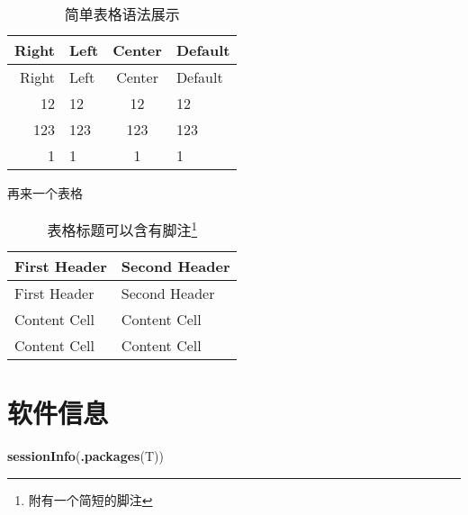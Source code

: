 \documentclass[
]{ctexbook}
\newenvironment{Shaded}{\begin{snugshade}}{\end{snugshade}}
\newcommand{\KeywordTok}[1]{\textcolor[rgb]{0.13,0.29,0.53}{\textbf{#1}}}
\newcommand{\NormalTok}[1]{#1}
\begin{document}
\begin{longtable}[]{@{}rlcl@{}}
\caption{\label{tab:simple-tab} 简单表格语法展示}\tabularnewline
\toprule
Right & Left & Center & Default\tabularnewline
\midrule
\endfirsthead
\toprule
Right & Left & Center & Default\tabularnewline
\midrule
\endhead
12 & 12 & 12 & 12\tabularnewline
123 & 123 & 123 & 123\tabularnewline
1 & 1 & 1 & 1\tabularnewline
\bottomrule
\end{longtable}

再来一个表格

\begin{longtable}[]{@{}ll@{}}
\caption[\label{tab:another-tab} 表格标题可以含有脚注]{\label{tab:another-tab} 表格标题可以含有脚注\footnote{附有一个简短的脚注}}\tabularnewline
\toprule
First Header & Second Header\tabularnewline
\midrule
\endfirsthead
\toprule
First Header & Second Header\tabularnewline
\midrule
\endhead
Content Cell & Content Cell\tabularnewline
Content Cell & Content Cell\tabularnewline
\bottomrule
\end{longtable}

\hypertarget{session-info}{%
\section{软件信息}\label{session-info}}

\begin{Shaded}
\begin{Highlighting}[]
\KeywordTok{sessionInfo}\NormalTok{(}\KeywordTok{.packages}\NormalTok{(T))}
\end{Highlighting}
\end{Shaded}
\end{document}
